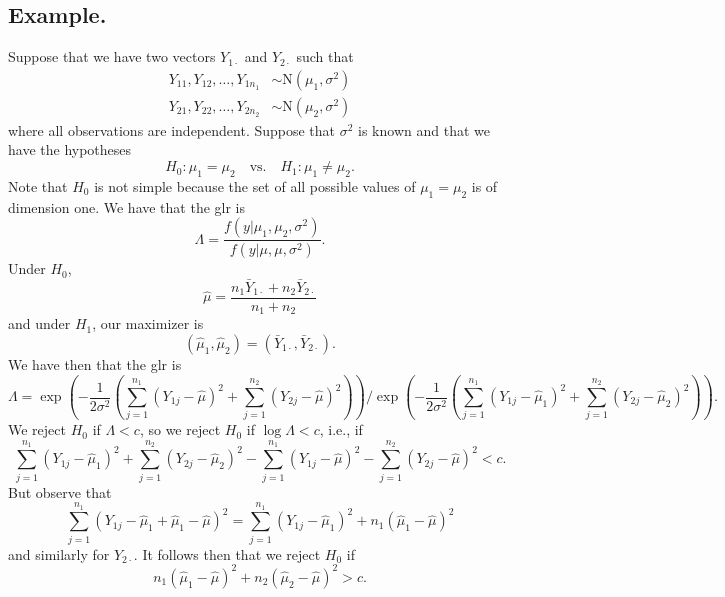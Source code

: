 \documentclass[titlepage]{article}
\begin{document}
\subsection{Example.} Suppose that we have two vectors $Y_{1\cdot}$ and $Y_{2\cdot}$ such that 
\begin{align*}
    Y_{11}, Y_{12}, \ldots, Y_{1n_{1}} &\sim \text{N}(\mu_{1}, \sigma^{2}) \\
    Y_{21}, Y_{22}, \ldots, Y_{2n_{2}} &\sim \text{N}(\mu_{2}, \sigma^{2})
\end{align*}
where all observations are independent. Suppose that $\sigma^{2}$ is known and that we have the hypotheses 
$$H_{0}: \mu_{1} = \mu_{2} \quad \text{vs.} \quad H_{1}: \mu_{1} \neq \mu_{2}.$$
Note that $H_{0}$ is not simple because the set of all possible values of $\mu_{1} = \mu_{2}$ is of dimension one. We have that the glr is 
$$\Lambda = \frac{f(y|\mu_{1}, \mu_{2}, \sigma^{2})}{f(y|\mu, \mu, \sigma^{2})}.$$
Under $H_{0}$, 
$$\hat{\mu} = \frac{n_{1}\bar{Y}_{1\cdot} + n_{2}\bar{Y}_{2\cdot}}{n_{1} + n_{2}}$$
and under $H_{1}$, our maximizer is 
$$(\hat{\mu}_{1}, \hat{\mu}_{2}) = (\bar{Y}_{1\cdot}, \bar{Y}_{2\cdot}).$$
We have then that the glr is 
$$\Lambda = \exp\left(-\frac{1}{2\sigma^{2}}\left(\sum_{j=1}^{n_{1}}(Y_{1j} - \hat{\mu})^{2} + \sum_{j=1}^{n_{2}}(Y_{2j} - \hat{\mu})^{2}\right)\right) / \exp\left(-\frac{1}{2\sigma^{2}}\left(\sum_{j=1}^{n_{1}}(Y_{1j} - \hat{\mu}_{1})^{2} + \sum_{j=1}^{n_{2}}(Y_{2j} - \hat{\mu}_{2})^{2}\right)\right).$$
We reject $H_{0}$ if $\Lambda < c$, so we reject $H_{0}$ if $\log\Lambda < c$, i.e., if 
$$\sum_{j=1}^{n_{1}}(Y_{1j} - \hat{\mu}_{1})^{2} + \sum_{j=1}^{n_{2}}(Y_{2j} - \hat{\mu}_{2})^{2} - \sum_{j=1}^{n_{1}}(Y_{1j} - \hat{\mu})^{2} - \sum_{j=1}^{n_{2}}(Y_{2j} - \hat{\mu})^{2} < c.$$
But observe that 
$$\sum_{j=1}^{n_{1}}(Y_{1j} - \hat{\mu}_{1} + \hat{\mu}_{1} - \hat{\mu})^{2} = \sum_{j=1}^{n_{1}}(Y_{1j} - \hat{\mu}_{1})^{2} + n_{1}(\hat{\mu}_{1} - \hat{\mu})^{2}$$
and similarly for $Y_{2\cdot}$. It follows then that we reject $H_{0}$ if 
$$n_{1}(\hat{\mu}_{1} - \hat{\mu})^{2} + n_{2}(\hat{\mu}_{2} - \hat{\mu})^{2} > c.$$
\end{document}
